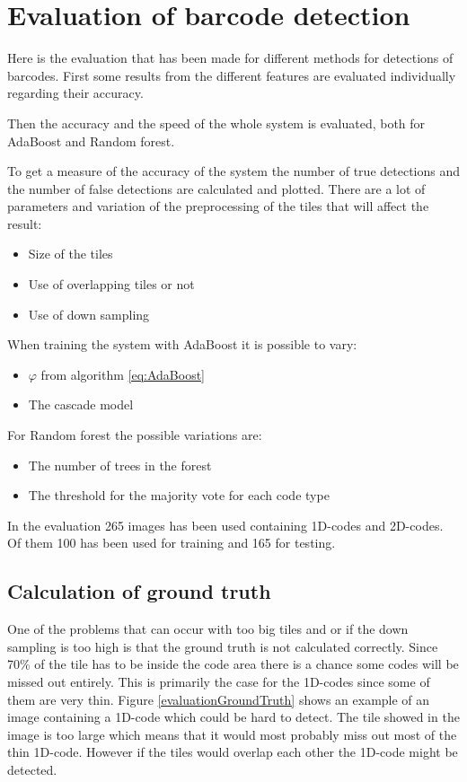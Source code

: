 

\chapter{Evaluation of barcode detection}
\label{sec:Evaluation of barcode detection}
Here is the evaluation that has been made for different methods for detections of barcodes. First some results from the different features are evaluated individually regarding their accuracy. 

Then the accuracy and the speed of the whole system is evaluated, both for AdaBoost and Random forest.

To get a measure of the accuracy of the system the number of true detections and the number of false detections are calculated and plotted. There are a lot of parameters and variation of the preprocessing of the tiles that will affect the result:

 \begin{itemize}
 	\item Size of the tiles
 	\item Use of overlapping tiles or not
 	\item Use of down sampling
 \end{itemize}
When training the system with AdaBoost it is possible to vary:
\begin{itemize}
	\item $\varphi$ from algorithm \ref{eq:AdaBoost}
	\item The cascade model
\end{itemize}

For Random forest the possible variations are:
\begin{itemize}
	\item The number of trees in the forest
	\item The threshold for the majority vote for each code type
\end{itemize} 	

In the evaluation 265 images has been used containing 1D-codes and 2D-codes. Of them 100 has been used for training and 165 for testing.

\section{Calculation of ground truth}
\label{sec:Calculation of ground truth}
One of the problems that can occur with too big tiles and or if the down sampling is too high is that the ground truth is not calculated correctly. Since 70\% of the tile has to be inside the code area there is a chance some codes will be missed out entirely. This is primarily the case for the 1D-codes since some of them are very thin. Figure \ref{evaluationGroundTruth} shows an example of an image containing a 1D-code which could be hard to detect. The tile showed in the image is too large which means that it would most probably miss out most of the thin 1D-code. However if the tiles would overlap each other the 1D-code might be detected. 


